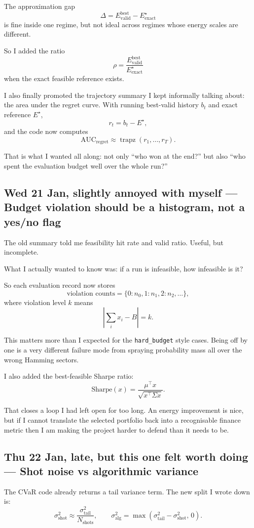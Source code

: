 \documentclass[11pt]{article}
\newcommand{\entry}[2]{\subsection*{#1 --- #2}}
\newcommand{\repo}[1]{\texttt{#1}}
\begin{document}
The approximation gap
\[
\Delta = E^{\text{best}}_{\text{valid}} - E^\star_{\text{exact}}
\]
is fine inside one regime, but not ideal across regimes whose energy scales are different.

So I added the ratio
\[
\rho
=
\frac{E^{\text{best}}_{\text{valid}}}{E^\star_{\text{exact}}}
\]
when the exact feasible reference exists.

I also finally promoted the trajectory summary I kept informally talking about:
the area under the regret curve.
With running best-valid history \(b_t\) and exact reference \(E^\star\),
\[
r_t = b_t - E^\star,
\]
and the code now computes
\[
\text{AUC}_{\text{regret}}
\approx
\operatorname{trapz}(r_1,\dots,r_T).
\]

That is what I wanted all along:
not only ``who won at the end?''
but also ``who spent the evaluation budget well over the whole run?''

\entry{Wed 21 Jan, slightly annoyed with myself}{Budget violation should be a histogram, not a yes/no flag}

The old summary told me feasibility hit rate and valid ratio.
Useful, but incomplete.

What I actually wanted to know was:
if a run is infeasible, how infeasible is it?

So each evaluation record now stores
\[
\text{violation counts} = \{0:n_0, 1:n_1, 2:n_2,\dots\},
\]
where violation level \(k\) means
\[
\left| \sum_i x_i - B \right| = k.
\]

This matters more than I expected for the \repo{hard\_budget} style cases.
Being off by one is a very different failure mode from spraying probability mass all over the
wrong Hamming sectors.

I also added the best-feasible Sharpe ratio:
\[
\text{Sharpe}(x)
=
\frac{\mu^\top x}{\sqrt{x^\top \Sigma x}}.
\]

That closes a loop I had left open for too long.
An energy improvement is nice, but if I cannot translate the selected portfolio back into a
recognisable finance metric then I am making the project harder to defend than it needs to be.

\entry{Thu 22 Jan, late, but this one felt worth doing}{Shot noise vs algorithmic variance}

The CVaR code already returns a tail variance term.
The new split I wrote down is:
\[
\sigma^2_{\text{shot}}
\approx
\frac{\sigma^2_{\text{tail}}}{N_{\text{shots}}},
\qquad
\sigma^2_{\text{alg}}
=
\max\!\left(\sigma^2_{\text{tail}} - \sigma^2_{\text{shot}},\, 0\right).
\]
\end{document}
